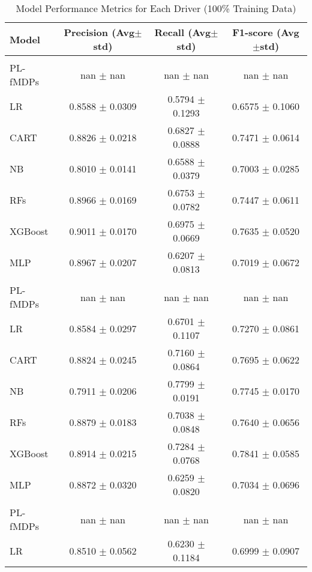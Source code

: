 \begin{table}[htbp]
\centering
\caption{Model Performance Metrics for Each Driver (100\% Training Data)}
\label{tab:driver_metrics}
\begin{tabular}{|l|ccc|}
\hline
\textbf{Model} & \textbf{Precision (Avg$\pm$std)} & \textbf{Recall (Avg$\pm$std)} & \textbf{F1-score (Avg$\pm$std)} \\
\hline
\vspace{2mm}
\multicolumn{4}{|c|}{\textbf{Driver 1}} \\
\hline
PL-fMDPs & nan $\pm$ nan & nan $\pm$ nan & nan $\pm$ nan \\
LR & 0.8588 $\pm$ 0.0309 & 0.5794 $\pm$ 0.1293 & 0.6575 $\pm$ 0.1060 \\
CART & 0.8826 $\pm$ 0.0218 & 0.6827 $\pm$ 0.0888 & 0.7471 $\pm$ 0.0614 \\
NB & 0.8010 $\pm$ 0.0141 & 0.6588 $\pm$ 0.0379 & 0.7003 $\pm$ 0.0285 \\
RFs & 0.8966 $\pm$ 0.0169 & 0.6753 $\pm$ 0.0782 & 0.7447 $\pm$ 0.0611 \\
XGBoost & 0.9011 $\pm$ 0.0170 & 0.6975 $\pm$ 0.0669 & 0.7635 $\pm$ 0.0520 \\
MLP & 0.8967 $\pm$ 0.0207 & 0.6207 $\pm$ 0.0813 & 0.7019 $\pm$ 0.0672 \\
\midrule
\vspace{2mm}
\multicolumn{4}{|c|}{\textbf{Driver 2}} \\
\hline
PL-fMDPs & nan $\pm$ nan & nan $\pm$ nan & nan $\pm$ nan \\
LR & 0.8584 $\pm$ 0.0297 & 0.6701 $\pm$ 0.1107 & 0.7270 $\pm$ 0.0861 \\
CART & 0.8824 $\pm$ 0.0245 & 0.7160 $\pm$ 0.0864 & 0.7695 $\pm$ 0.0622 \\
NB & 0.7911 $\pm$ 0.0206 & 0.7799 $\pm$ 0.0191 & 0.7745 $\pm$ 0.0170 \\
RFs & 0.8879 $\pm$ 0.0183 & 0.7038 $\pm$ 0.0848 & 0.7640 $\pm$ 0.0656 \\
XGBoost & 0.8914 $\pm$ 0.0215 & 0.7284 $\pm$ 0.0768 & 0.7841 $\pm$ 0.0585 \\
MLP & 0.8872 $\pm$ 0.0320 & 0.6259 $\pm$ 0.0820 & 0.7034 $\pm$ 0.0696 \\
\midrule
\vspace{2mm}
\multicolumn{4}{|c|}{\textbf{Driver 3}} \\
\hline
PL-fMDPs & nan $\pm$ nan & nan $\pm$ nan & nan $\pm$ nan \\
LR & 0.8510 $\pm$ 0.0562 & 0.6230 $\pm$ 0.1184 & 0.6999 $\pm$ 0.0907 \\

\end{tabular}
\end{table}
